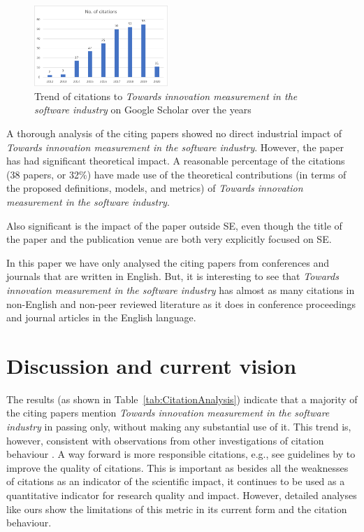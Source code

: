\documentclass[sigconf,review]{acmart}
\newcommand{\theArticle}{\textit{Towards innovation measurement in the software industry}}
\begin{document}
\begin{figure}
	\begin{center}
		\includegraphics[width=0.45\textwidth,height=\textheight,keepaspectratio]{Figures/CitationsTrend.pdf}
	\end{center}
	\caption{Trend of citations to \theArticle{} on Google Scholar over the years}
	\label{fig:citationTrend}
\end{figure}

A thorough analysis of the citing papers showed no direct industrial impact of \theArticle. However, the paper has had significant theoretical impact. A reasonable percentage of the citations (38 papers, or 32\%) have made use of the theoretical contributions (in terms of the proposed definitions, models, and metrics) of \theArticle. 

Also significant is the impact of the paper outside SE, even though the title of the paper and the publication venue are both very explicitly focused on SE.

In this paper we have only analysed the citing papers from conferences and journals that are written in English. But, it is interesting to see that \theArticle{} has almost as many citations in non-English and non-peer reviewed literature as it does in conference proceedings and journal articles in the English language. 

\section{Discussion and current vision}\label{sec:fw}
The results (as shown in Table~\ref{tab:CitationAnalysis}) indicate that a majority of the citing papers mention \theArticle{} in passing only, without making any substantial use of it. This trend is, however, consistent with observations from other investigations of citation behaviour \cite{poulding2015using,bornmann2008citation}. A way forward is more responsible citations, e.g., see guidelines by \citet{penders2018ten} to improve the quality of citations. This is important as besides all the weaknesses of citations as an indicator of the scientific impact, it continues to be used as a quantitative indicator for research quality and impact. However, detailed analyses like ours show the limitations of this metric in its current form and the citation behaviour. 
\end{document}
